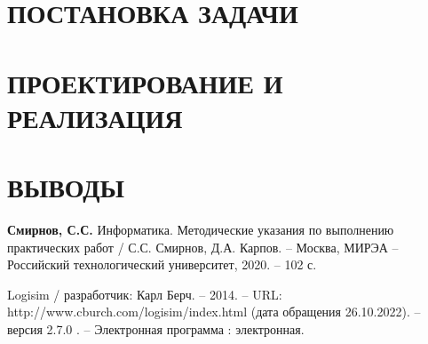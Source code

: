 \documentclass{mirea}
\author     {Фамилия И.O.}
\begin{document}
\chapter{ПОСТАНОВКА ЗАДАЧИ}
\chapter{ПРОЕКТИРОВАНИЕ И РЕАЛИЗАЦИЯ}
\chapter{ВЫВОДЫ}

\begin{thebibliography}{99}
	 \textbf{Смирнов, С.С.} Информатика. Методические указания по выполнению практических работ / С.С. Смирнов, Д.А. Карпов. – Москва, МИРЭА – Российский технологический университет, 2020. – 102 с.
	
	 Logisim / разработчик: Карл Берч. – 2014. – URL: http://www.cburch.com/logisim/index.html (дата обращения 26.10.2022). – версия 2.7.0 . – Электронная программа : электронная.
\end{thebibliography}
\end{document}
